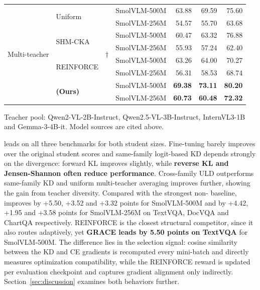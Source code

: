 \begin{table}
\begin{threeparttable}
\begin{tabular}{@{}llllrrr@{}}
\midrule
\multirow{8}{*}{Multi-teacher}
  & \multirow{2}{*}{Uniform}
  & \multirow{8}{*}{\(\dagger\)}
  & SmolVLM-500M & 63.88 & 69.59 & 75.60 \\
& & & SmolVLM-256M & 54.57 & 55.70 & 63.68 \\
\cmidrule(lr){4-7}
& \multirow{2}{*}{SHM-CKA} &
  & SmolVLM-500M & 60.47 & 63.32 & 76.88 \\
& & & SmolVLM-256M & 55.93 & 57.24 & 62.40 \\
\cmidrule(lr){4-7}
& \multirow{2}{*}{REINFORCE} &
  & SmolVLM-500M & 63.26 & 64.00 & 70.27 \\
& & & SmolVLM-256M & 56.31 & 58.53 & 68.74 \\
\cmidrule(lr){4-7}
& \multirow{2}{*}{\textbf{\methodname{} (Ours)}} &
  & SmolVLM-500M & \textbf{69.38} & \textbf{73.11} & \textbf{80.20} \\
& & & SmolVLM-256M & \textbf{60.73} & \textbf{60.48} & \textbf{72.32} \\
\bottomrule
\end{tabular}
\begin{tablenotes}[flushleft]
\scriptsize
\item[\(\dagger\)] Teacher pool: Qwen2-VL-2B-Instruct, Qwen2.5-VL-3B-Instruct, InternVL3-1B and Gemma-3-4B-it. Model sources are cited above.
\end{tablenotes}
\end{threeparttable}
\end{table}

\methodname{} leads on all three benchmarks for both student sizes. Fine-tuning barely improves over the original student scores and same-family
logit-based KD depends strongly on the divergence:
forward KL improves slightly, while \textbf{reverse KL and Jensen-Shannon often reduce
performance}.
Cross-family ULD outperforms same-family KD and uniform multi-teacher
averaging improves further, showing the gain from teacher diversity. Compared with the strongest non-\methodname{} baseline,
\methodname{} improves by +5.50, +3.52 and +3.32 points for SmolVLM-500M and
by +4.42, +1.95 and +3.58 points for SmolVLM-256M on TextVQA, DocVQA and
ChartQA respectively. REINFORCE is the closest structural competitor, since it also routes
adaptively, yet \textbf{GRACE leads by 5.50 points on TextVQA} for SmolVLM-500M.
The difference lies in the selection signal: cosine similarity between the KD
and CE gradients is recomputed every mini-batch and directly measures
optimization compatibility, while the REINFORCE reward is updated per
evaluation checkpoint and captures gradient alignment only indirectly. Section~\ref{sec:discussion}
examines both behaviors further.

